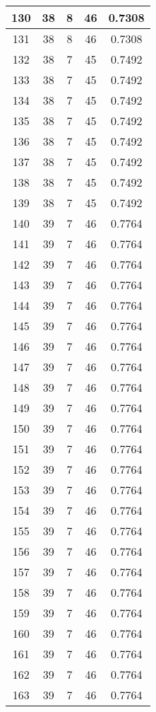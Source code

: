 \documentclass[letterpaper, 12pt]{article}
\begin{document}
\begin{longtable}{|c|c|c|c|c|}
\hline
130 & 38 & 8 & 46 & 0.7308 \\
\hline
131 & 38 & 8 & 46 & 0.7308 \\
\hline
132 & 38 & 7 & 45 & 0.7492 \\
\hline
133 & 38 & 7 & 45 & 0.7492 \\
\hline
134 & 38 & 7 & 45 & 0.7492 \\
\hline
135 & 38 & 7 & 45 & 0.7492 \\
\hline
136 & 38 & 7 & 45 & 0.7492 \\
\hline
137 & 38 & 7 & 45 & 0.7492 \\
\hline
138 & 38 & 7 & 45 & 0.7492 \\
\hline
139 & 38 & 7 & 45 & 0.7492 \\
\hline
140 & 39 & 7 & 46 & 0.7764 \\
\hline
141 & 39 & 7 & 46 & 0.7764 \\
\hline
142 & 39 & 7 & 46 & 0.7764 \\
\hline
143 & 39 & 7 & 46 & 0.7764 \\
\hline
144 & 39 & 7 & 46 & 0.7764 \\
\hline
145 & 39 & 7 & 46 & 0.7764 \\
\hline
146 & 39 & 7 & 46 & 0.7764 \\
\hline
147 & 39 & 7 & 46 & 0.7764 \\
\hline
148 & 39 & 7 & 46 & 0.7764 \\
\hline
149 & 39 & 7 & 46 & 0.7764 \\
\hline
150 & 39 & 7 & 46 & 0.7764 \\
\hline
151 & 39 & 7 & 46 & 0.7764 \\
\hline
152 & 39 & 7 & 46 & 0.7764 \\
\hline
153 & 39 & 7 & 46 & 0.7764 \\
\hline
154 & 39 & 7 & 46 & 0.7764 \\
\hline
155 & 39 & 7 & 46 & 0.7764 \\
\hline
156 & 39 & 7 & 46 & 0.7764 \\
\hline
157 & 39 & 7 & 46 & 0.7764 \\
\hline
158 & 39 & 7 & 46 & 0.7764 \\
\hline
159 & 39 & 7 & 46 & 0.7764 \\
\hline
160 & 39 & 7 & 46 & 0.7764 \\
\hline
161 & 39 & 7 & 46 & 0.7764 \\
\hline
162 & 39 & 7 & 46 & 0.7764 \\
\hline
163 & 39 & 7 & 46 & 0.7764 \\

\end{longtable}
\end{document}
